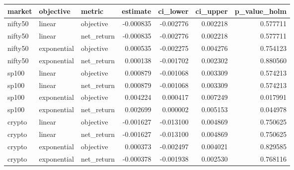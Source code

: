 \begin{tabular}{lllrrrr}
\toprule
market & objective & metric & estimate & ci\_lower & ci\_upper & p\_value\_holm \\
\midrule
nifty50 & linear & objective & -0.000835 & -0.002776 & 0.002218 & 0.577711 \\
nifty50 & linear & net\_return & -0.000835 & -0.002776 & 0.002218 & 0.577711 \\
nifty50 & exponential & objective & 0.000535 & -0.002275 & 0.004276 & 0.754123 \\
nifty50 & exponential & net\_return & 0.000138 & -0.001702 & 0.002302 & 0.880560 \\
sp100 & linear & objective & 0.000879 & -0.001068 & 0.003309 & 0.574213 \\
sp100 & linear & net\_return & 0.000879 & -0.001068 & 0.003309 & 0.574213 \\
sp100 & exponential & objective & 0.004224 & 0.000417 & 0.007249 & 0.017991 \\
sp100 & exponential & net\_return & 0.002699 & 0.000002 & 0.005153 & 0.044978 \\
crypto & linear & objective & -0.001627 & -0.013100 & 0.004869 & 0.750625 \\
crypto & linear & net\_return & -0.001627 & -0.013100 & 0.004869 & 0.750625 \\
crypto & exponential & objective & 0.000373 & -0.002497 & 0.004021 & 0.829585 \\
crypto & exponential & net\_return & -0.000378 & -0.001938 & 0.002530 & 0.768116 \\
\bottomrule
\end{tabular}
